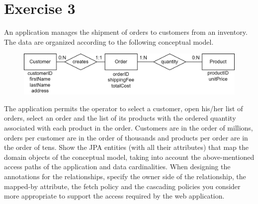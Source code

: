 \section{Exercise 3}

An application manages the shipment of orders to customers from an inventory. 
The data are organized according to the following conceptual model. 
\begin{figure}[H]
    \centering
    \includegraphics[width=0.75\linewidth]{images/jpa.png}
\end{figure}
The application permits the operator to select a customer, open his/her list of orders, select an order and the list of its products with the ordered quantity associated with each product in the order. 
Customers are in the order of millions, orders per customer are in the order of thousands and products per order are in the order of tens.
Show the JPA entities (with all their attributes) that map the domain objects of the conceptual model, taking into account the above-mentioned access paths of the application and data cardinalities.
When designing the annotations for the relationships, specify the owner side of the relationship, the mapped-by attribute, the fetch policy and the cascading policies you consider more appropriate to support the access required by the web application. 

